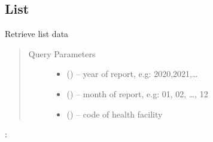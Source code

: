 \documentclass[letterpaper,10pt,english,openany,oneside]{sphinxmanual}
\begin{document}
\subsection{List}
\label{\detokenize{api/v4:id5}}

\begin{fulllineitems}
\label{\detokenize{api/v4:get--api4-ReactiveCase-list}}
\sphinxAtStartPar
Retrieve list data
\begin{quote}\begin{description}
\item[{Query Parameters}] \leavevmode\begin{itemize}
\item {} 
\sphinxAtStartPar
{} () – year of report, e.g: 2020,2021,…

\item {} 
\sphinxAtStartPar
{} () – month of report, e.g: 01, 02, …, 12

\item {} 
\sphinxAtStartPar
{} () – code of health facility

\end{itemize}

\end{description}\end{quote}

\sphinxAtStartPar
{}:


\end{fulllineitems}
\end{document}
